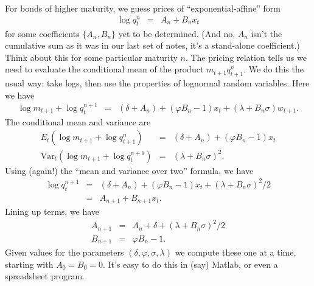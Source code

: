 \documentclass[11pt]{article}
\begin{document}
For bonds of higher maturity, we
guess prices of ``exponential-affine'' form
\begin{eqnarray*}
    \log q^n_t &=& A_n + B_n x_t
\end{eqnarray*}
for some coefficients $\{ A_n, B_n\}$ yet to be determined.
(And no, $A_n$ isn't the cumulative sum as it was
in our last set of notes, it's a stand-alone coefficient.)
Think about this for some particular maturity $n$.
The pricing relation tells us we
need to evaluate the conditional mean of the product
$m_{t+1} q^n_{t+1}$.
We do this the usual way:  take logs, then use the properties
of lognormal random variables.
Here we have
\begin{eqnarray*}
    \log m_{t+1} + \log q^{n+1}_t &=&
            (\delta + A_n) + (\varphi B_n -1) x_t + (\lambda + B_n \sigma) w_{t+1} .
\end{eqnarray*}
The conditional mean and variance are
\begin{eqnarray*}
   E_t \left( \log m_{t+1} + \log q^{n}_{t+1} \right) &=&
            (\delta + A_n) + (\varphi B_n -1) x_t \\
   \mbox{Var}_t \left( \log m_{t+1} + \log q^{n+1}_t \right) &=&
            (\lambda + B_n \sigma)^2 .
\end{eqnarray*}
Using (again!) the ``mean and variance over two'' formula, we have
\begin{eqnarray*}
    \log q^{n+1}_t &=&
            (\delta + A_n) + (\varphi B_n -1) x_t + (\lambda + B_n \sigma)^2/2 \\
                &=& A_{n+1} + B_{n+1} x_t.
\end{eqnarray*}
Lining up terms, we have
\begin{eqnarray*}
    A_{n+1} &=& A_n + \delta + (\lambda + B_n\sigma)^2/2 \\
    B_{n+1} &=& \varphi B_n - 1 .
\end{eqnarray*}
Given values for the parameters $(\delta, \varphi, \sigma, \lambda)$
we compute these one at a time,
starting with $A_0 = B_0 = 0$.
It's easy to do this in (say) Matlab, or even a spreadsheet program.
\end{document}
